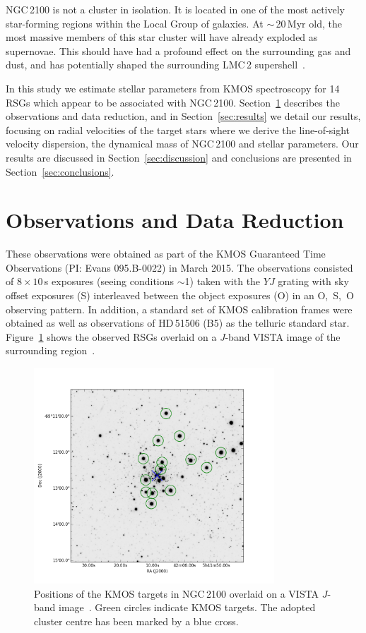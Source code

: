 \documentclass[useAMS,usenatbib]{mn2e}
\begin{document}
NGC\,2100 is not a cluster in isolation.
It is located in one of the most actively star-forming regions within the Local Group of galaxies.
At $\sim$\,20\,Myr old, the most massive members of this star cluster will have already exploded as supernovae.
This should have had a profound effect on the surrounding gas and dust, and has potentially shaped the surrounding LMC\,2 supershell~\citep[see][]{1999ApJ...518..298P}.


In this study we estimate stellar parameters from KMOS spectroscopy for 14 RSGs which appear to be associated with NGC\,2100.
Section~\ref{sec:observations} describes the observations and data reduction, and in Section~\ref{sec:results} we detail our results, focusing on radial velocities of the target stars where we derive the line-of-sight velocity dispersion,
the dynamical mass of NGC\,2100 and stellar parameters.
Our results are discussed in Section~\ref{sec:discussion} and conclusions are presented in Section~\ref{sec:conclusions}.



\section{Observations and Data Reduction} %
\label{sec:observations}
These observations were obtained as part of the KMOS Guaranteed Time Observations (PI: Evans 095.B-0022) in March 2015.
The observations consisted of $8\times10$\,s exposures (seeing conditions $\sim$1) taken with the $YJ$ grating with sky offset exposures (S) interleaved between the object exposures (O) in an O,~S,~O observing pattern.
In addition, a standard set of KMOS calibration frames were obtained as well as observations of HD\,51506 (B5) as the telluric standard star.
Figure~\ref{fig:targets} shows the observed RSGs overlaid on a {\it J}-band VISTA image of the surrounding region~\citep{2011A&A...527A.116C}.

\begin{figure}
 \includegraphics[width=9.0cm]{NGC2100-targets}
 \caption{Positions of the KMOS targets in NGC\,2100 overlaid on a VISTA $J$-band image~\citep{2011A&A...527A.116C}.
          Green circles indicate KMOS targets.
          The adopted cluster centre has been marked by a blue cross.\label{fig:targets}
          }
\end{figure}
\end{document}
